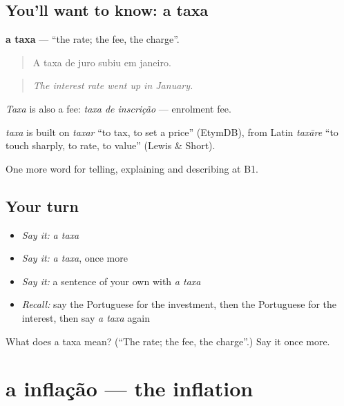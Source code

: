 \subsection*{You'll want to know: a taxa}
\textbf{a taxa} — \textquotedblleft{}the rate; the fee, the charge\textquotedblright{}.

\begin{quote}
A taxa de juro subiu em janeiro.
\end{quote}

\begin{quote}
\emph{The interest rate went up in January.}
\end{quote}

\emph{Taxa} is also a fee: \emph{taxa de inscrição} — enrolment fee.

\begin{cousinweb}
\emph{taxa} is built on \emph{taxar} \textquotedblleft{}to tax, to set a price\textquotedblright{} (EtymDB), from Latin \emph{taxāre} \textquotedblleft{}to touch sharply, to rate, to value\textquotedblright{} (Lewis \& Short).
\end{cousinweb}

\begin{grammarlens}[title={What you've built}]
One more word for telling, explaining and describing at B1.
\end{grammarlens}

\subsection*{Your turn}
\begin{itemize}
\raggedright
  \item \emph{Say it:} \emph{a taxa}
  \item \emph{Say it:} \emph{a taxa}, once more
  \item \emph{Say it:} a sentence of your own with \emph{a taxa}
  \item \emph{Recall:} say the Portuguese for the investment, then the Portuguese for the interest, then say \emph{a taxa} again
\end{itemize}

\begin{tcolorbox}[breakable,colback=teal!4,colframe=teal!35!black,title={Before you move on}]
What does a taxa mean? (\textquotedblleft{}The rate; the fee, the charge\textquotedblright{}.) Say it once more.
\end{tcolorbox}
\section[a inflação]{a inflação — the inflation}

